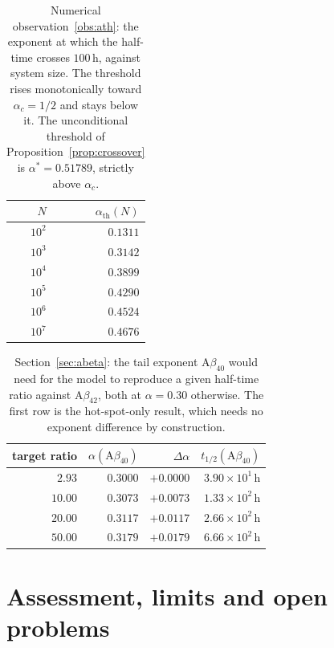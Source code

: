 \documentclass[11pt,reqno]{amsart}
\theoremstyle{plain}
\theoremstyle{definition}
\theoremstyle{remark}
\numberwithin{equation}{section}
\newcommand{\Ab}{\mathrm{A}\beta}
\newcommand{\ac}{\alpha_c}
\newcommand{\ath}{\alpha_{\mathrm{th}}}
\begin{document}
\begin{table}[ht]
\centering\small\setlength{\tabcolsep}{8pt}
\caption{Numerical observation~\ref{obs:ath}: the exponent at which the half-time crosses $100$\,h, against system size. The threshold rises monotonically toward $\ac=1/2$ and stays below it. The unconditional threshold of Proposition~\ref{prop:crossover} is $\alpha^\ast=0.51789$, strictly above $\ac$.}
\label{tab:crossover}
\begin{tabular}{@{}r r@{}}
\toprule
$N$ & $\ath(N)$\\
\midrule
$10^{2}$ & $0.1311$\\
$10^{3}$ & $0.3142$\\
$10^{4}$ & $0.3899$\\
$10^{5}$ & $0.4290$\\
$10^{6}$ & $0.4524$\\
$10^{7}$ & $0.4676$\\
\bottomrule
\end{tabular}
\end{table}

\begin{table}[ht]
\centering\small\setlength{\tabcolsep}{6pt}
\caption{Section~\ref{sec:abeta}: the tail exponent $\Ab_{40}$ would need for the model to reproduce a given half-time ratio against $\Ab_{42}$, both at $\alpha=0.30$ otherwise. The first row is the hot-spot-only result, which needs no exponent difference by construction.}
\label{tab:abeta}
\begin{tabular}{@{}r r r r@{}}
\toprule
target ratio & $\alpha(\Ab_{40})$ & $\Delta\alpha$ & $t_{1/2}(\Ab_{40})$\\
\midrule
$2.93$ & $0.3000$ & $+0.0000$ & $3.90 \times 10^{1}$\,h\\
$10.00$ & $0.3073$ & $+0.0073$ & $1.33 \times 10^{2}$\,h\\
$20.00$ & $0.3117$ & $+0.0117$ & $2.66 \times 10^{2}$\,h\\
$50.00$ & $0.3179$ & $+0.0179$ & $6.66 \times 10^{2}$\,h\\
\bottomrule
\end{tabular}
\end{table}

\clearpage

\section{Assessment, limits and open problems}
\label{sec:assess}
\end{document}
